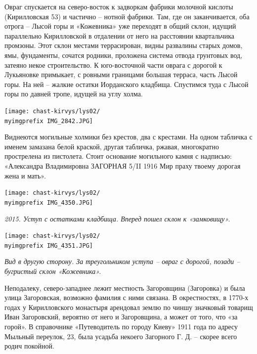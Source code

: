 \newpage

Овраг спускается на северо-восток к задворкам фабрики молочной кислоты (Кирилловская 53) и частично – нотной фабрики. Там, где он заканчивается, оба отрога – Лысой горы и «Кожевника» уже переходят в общий склон, идущий параллельно Кирилловской в отдалении от него на расстоянии квартальчика промзоны. Этот склон местами террасирован, видны развалины старых домов, ямы, фундаменты, сочатся родники, проложена система отвода грунтовых вод, затеяно некое строительство. К юго-восточной части оврага с дорогой к Лукьяновке примыкает, с ровными границами большая терраса, часть Лысой горы. На ней – жалкие остатки Иорданского кладбища. Спустимся туда с Лысой горы по давней тропе, идущей на углу холма.

\begin{center}
\texttt{[image: chast-kirvys/lys02/\\myimgprefix IMG\_2842.JPG]}
\end{center}

Виднеются могильные холмики без крестов, два с крестами. На одном табличка с именем замазана белой краской, другая табличка, ржавая, многократно прострелена из пистолета. Стоит основание могильного камня с надписью: «Александра Владимировна ЗАГОРНАЯ 5/II 1916 Мир праху твоему дорогая жена и мать». 

\newpage

\begin{center}
\texttt{[image: chast-kirvys/lys02/\\myimgprefix IMG\_4350.JPG]}

\textit{2015. Уступ с остатками кладбища. Вперед пошел склон к «замковищу».}
\end{center}

\begin{center}
\texttt{[image: chast-kirvys/lys02/\\myimgprefix IMG\_4351.JPG]}

\textit{Вид в другую сторону. За треугольником уступа – овраг с дорогой, позади – бугристый склон «Кожевника».}
\end{center}

\newpage

Неподалеку, северо-западнее лежит местность Загоровщина (Загоровка) и была улица Загоровская, возможно фамилия с ними связана. В окрестностях, в 1770-х годах у Кирилловского монастыря арендовал землю по чиншу значковый товарищ Иван Загоровский, вероятно от него и Загоровщина, а может от того, что «за горой». В справочнике «Путеводитель по городу Киеву» 1911 года по адресу Мыльный переулок, 23, была усадьба некоего Загорного Г. Д. – скорее всего родич покойной.

